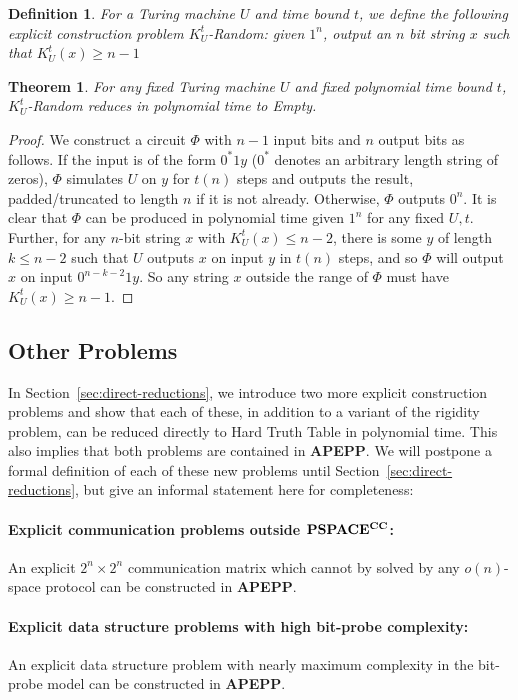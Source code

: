 \documentclass[11pt]{article}
\newtheorem{theorem}{Theorem}
\newtheorem{definition}{Definition}
\def\cl{\bf}
\begin{document}
\begin{definition}
For a Turing machine $U$ and time bound $t$, we define the following explicit construction problem {\sc $K_U^t$-Random}: given $1^n$, output an $n$ bit string $x$ such that $K_U^t(x) \geq n - 1$
\end{definition}

\begin{theorem}\label{thm:kt-random}
For any fixed Turing machine $U$ and fixed polynomial time bound $t$, {\sc $K_U^t$-Random} reduces in polynomial time to {\sc Empty}.
\end{theorem}
\begin{proof}
We construct a circuit $\Phi$ with $n-1$ input bits and $n$ output bits as follows. If the input is of the form $0^*1y$ ($0^*$ denotes an arbitrary length string of zeros), $\Phi$ simulates $U$ on $y$ for $t(n)$ steps and outputs the result, padded/truncated to length $n$ if it is not already. Otherwise, $\Phi$ outputs $0^n$. It is clear that $\Phi$ can be produced in polynomial time given $1^n$ for any fixed $U,t$. Further, for any $n$-bit string $x$ with $K_U^t(x) \leq n - 2$, there is some $y$ of length $k \leq n-2$ such that $U$ outputs $x$ on input $y$ in $t(n)$ steps, and so $\Phi$ will output $x$ on input $0^{n-k-2}1y$. So any string $x$ outside the range of $\Phi$ must have $K_U^t(x) \geq n - 1$.
\end{proof}

\subsection{Other Problems}
In Section~\ref{sec:direct-reductions}, we introduce two more explicit construction problems and show that each of these, in addition to a variant of the rigidity problem, can be reduced directly to {\sc Hard Truth Table} in polynomial time. This also implies that both problems are contained in {\cl APEPP}. We will  postpone a formal definition of each of these new problems until Section~\ref{sec:direct-reductions}, but give an informal statement here for completeness:

\paragraph{Explicit communication problems outside ${\cl PSPACE^{CC}}$:} An explicit $2^n \times 2^n$ communication matrix which cannot by solved by any $o(n)$-space protocol can be constructed in  {\cl APEPP}.

\paragraph{Explicit data structure problems with high bit-probe complexity:} An explicit data structure problem with nearly maximum complexity in the bit-probe model can be constructed in {\cl APEPP}.
\end{document}
